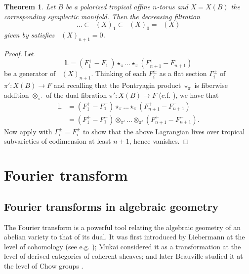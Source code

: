 \documentclass[10pt]{amsart}
\newtheorem{thm}{Theorem}[section]
\theoremstyle{definition}
\theoremstyle{remark}
\DeclareMathOperator{\Cobfib}{\mathrm{Cob}_{\mathrm{fib}}}
\begin{document}
\begin{thm}\label{thm:filtration_terminates}
    Let $B$ be a polarized tropical affine $n$-torus and $X = X(B)$ the corresponding symplectic manifold.
    Then the decreasing filtration 
    $$
        \dots \subset \Cobfib(X)_1 \subset \Cobfib(X)_0 = \Cobfib(X)
    $$
    given by  satisfies $\Cobfib(X)_{n+1} = 0$.    
\end{thm}
\begin{proof}
    Let
    $$
    \mathbb{L} = (F_1^+ - F_1^-) \star_{\pi} \dots \star_{\pi} (F_{n+1}^+ - F_{n+1}^-)
    $$
    be a generator of $\Cobfib(X)_{n+1}$.
    Thinking of each $F_i^\pm$ as a flat section $\Gamma_i^\pm$ of $\pi':X(B) \to F$ and recalling that the Pontryagin product $\star_{\pi}$ is fiberwise addition $\otimes_{\pi'}$ of the dual fibration $\pi': X(B) \to F$ (c.f. ), we have that
    \begin{align*}
        \mathbb{L} &= (F_1^+ - F_1^-) \star_{\pi} \dots \star_{\pi} (F_{n+1}^+ - F_{n+1}^-)\\
        & = (F_1^+ - F_1^-) \otimes_{\pi'} \dots \otimes_{\pi'} (F_{n+1}^+ - F_{n+1}^-).
    \end{align*}
    Now apply  with $\Gamma_i^\pm = F_i^\pm$ to show that the above Lagrangian lives over tropical subvarieties of codimension at least $n+1$, hence vanishes.



\end{proof}
 
\section{Fourier transform}
\subsection{Fourier transforms in algebraic geometry}\label{sec:fourier}
The Fourier transform is a powerful tool relating the algebraic geometry of an abelian variety to that of its dual.
It was first introduced by Liebermann at the level of cohomology (see e.g. \cite{kleiman1968algebraic}); Mukai \cite{mukai1981duality} considered it as a transformation at the level of derived categories of coherent sheaves; and later Beauville studied it at the level of Chow groups \cite{beauville1986anneau,beauville2006quelques}.
\end{document}
